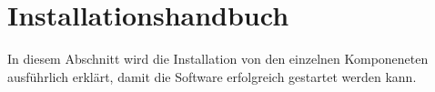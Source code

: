 \section{Installationshandbuch}
In diesem Abschnitt wird die Installation von den einzelnen Komponeneten
ausführlich erklärt, damit die Software erfolgreich gestartet werden kann.